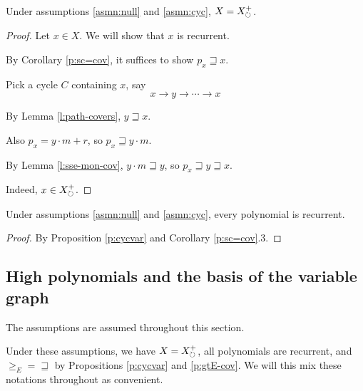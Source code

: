 \documentclass[numbers=enddot]{scrartcl}
\newcommand{\gtE}{\geq_E}
\newcommand{\cov}{\sqsupseteq}
\newcommand{\const}[1]{\ul{\mathbf{#1}}}
\begin{document}
\begin{prop} \label{p:cycvar}
Under assumptions \ref{asmn:null} and \ref{asmn:cyc}, $X = X_{\circlearrowright}^+$.
\end{prop}
\begin{proof}
Let $x \in X$. We will show that $x$ is recurrent.

By Corollary \ref{p:sc=cov}, it suffices to show $p_x \cov x$.

Pick a cycle $C$ containing $x$, say 
\[ x \to y \to \cdots \to x\]

By Lemma \ref{l:path-covers}, $y \cov x$.

Also $p_x = y \cdot m + r$, so $p_x \cov y \cdot m$.

By Lemma \ref{l:sse-mon-cov}, $y \cdot m \cov y$, so $p_x \cov y \cov x$.

Indeed, $x \in X_{\circlearrowright}^+$.
\end{proof}

\begin{cor}\label{c:recur}
  Under assumptions \ref{asmn:null} and \ref{asmn:cyc}, every polynomial is recurrent.
\end{cor}
\begin{proof}
  By Proposition \ref{p:cycvar} and Corollary \ref{p:sc=cov}.3.
\end{proof}

\subsection{High polynomials and the basis of the variable graph}

The assumptions are assumed throughout this section.

Under these assumptions, we have $X = X_{\circlearrowright}^+$, all polynomials are recurrent, and $\gtE = \cov$ 
by Propositions \ref{p:cycvar} and \ref{p:gtE-cov}.
We will this mix these notations throughout as convenient.

\end{document}
